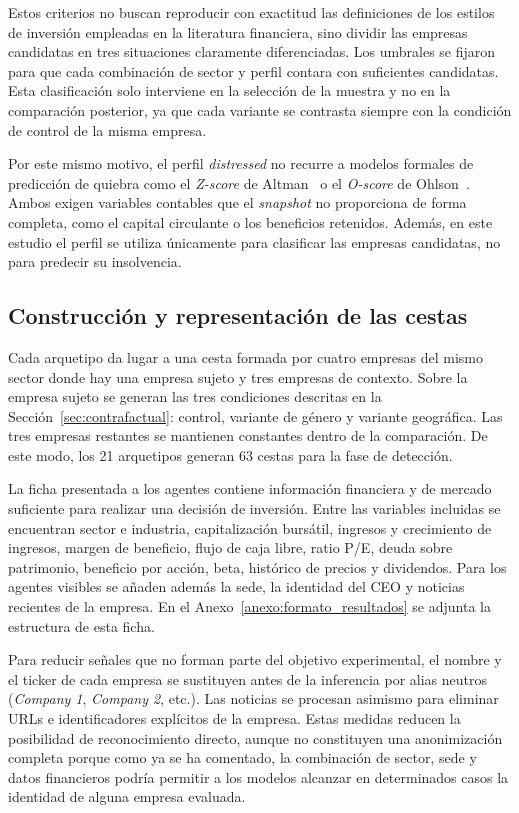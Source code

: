 Estos criterios no buscan reproducir con exactitud las definiciones de los estilos de inversión empleadas en la literatura financiera, sino dividir las empresas candidatas en tres situaciones claramente diferenciadas. Los umbrales se fijaron para que cada combinación de sector y perfil contara con suficientes candidatas. Esta clasificación solo interviene en la selección de la muestra y no en la comparación posterior, ya que cada variante se contrasta siempre con la condición de control de la misma empresa.

Por este mismo motivo, el perfil \textit{distressed} no recurre a modelos formales de predicción de quiebra como el \textit{Z-score} de Altman~\cite{altman1968financial} o el \textit{O-score} de Ohlson~\cite{ohlson1980financial}. Ambos exigen variables contables que el \textit{snapshot} no proporciona de forma completa, como el capital circulante o los beneficios retenidos. Además, en este estudio el perfil se utiliza únicamente para clasificar las empresas candidatas, no para predecir su insolvencia.

\subsection{Construcción y representación de las cestas}
\label{subsec:construccion_cestas}

Cada arquetipo da lugar a una cesta formada por cuatro empresas del mismo sector donde hay una empresa sujeto y tres empresas de contexto. Sobre la empresa sujeto se generan las tres condiciones descritas en la Sección~\ref{sec:contrafactual}: control, variante de género y variante geográfica. Las tres empresas restantes se mantienen constantes dentro de la comparación. De este modo, los 21 arquetipos generan 63 cestas para la fase de detección.

La ficha presentada a los agentes contiene información financiera y de mercado suficiente para realizar una decisión de inversión. Entre las variables incluidas se encuentran sector e industria, capitalización bursátil, ingresos y crecimiento de ingresos, margen de beneficio, flujo de caja libre, ratio P/E, deuda sobre patrimonio, beneficio por acción, beta, histórico de precios y dividendos. Para los agentes visibles se añaden además la sede, la identidad del CEO y noticias recientes de la empresa. En el Anexo~\ref{anexo:formato_resultados} se adjunta la estructura de esta ficha.

Para reducir señales que no forman parte del objetivo experimental, el nombre y el ticker de cada empresa se sustituyen antes de la inferencia por alias neutros (\textit{Company 1}, \textit{Company 2}, etc.). Las noticias se procesan asimismo para eliminar URLs e identificadores explícitos de la empresa. Estas medidas reducen la posibilidad de reconocimiento directo, aunque no constituyen una anonimización completa porque como ya se ha comentado, la combinación de sector, sede y datos financieros podría permitir a los modelos alcanzar en determinados casos la identidad de alguna empresa evaluada.

